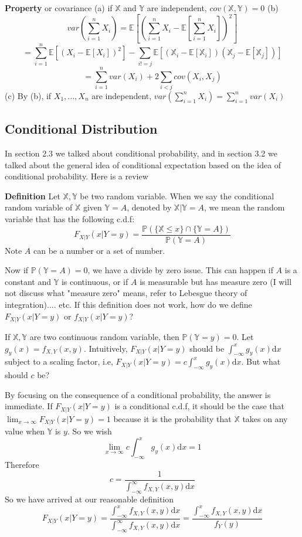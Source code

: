 \documentclass[a4paper,12pt]{article}
\begin{document}
\textbf{Property} or covariance 
(a) if $\mathbb{X}$ and $\mathbb{Y}$ are independent, $cov( \mathbb{X}, \mathbb{Y} ) = 0$ 
(b) $$var(\sum_{i=1}^n X_i) = \mathbb{E}[(\sum_{i=1}^n X_i - \mathbb{E}[\sum_{i=1}^n X_i])^2]$$
$$= \sum_{i=1}^n \mathbb{E}[ (X_i - \mathbb{E}[X_i])^2 ] - \sum_{i!=j}\mathbb{E}[ (\mathbb{X}_i - \mathbb{E}[\mathbb{X}_i])(\mathbb{X}_j - \mathbb{E}[\mathbb{X}_j]) ]$$
$$= \sum_{i=1}^n var(X_i) + 2 \sum_{i<j}cov(X_i, X_j)$$
(c) By (b), if $X_1, ..., X_n$ are independent, $var(\sum_{i=1}^n X_i) = \sum_{i=1}^n var(X_i)$ 

\subsection{Conditional Distribution}
In section 2.3 we talked about conditional probability, and in section 3.2 we talked about the general idea of conditional expectation based on the idea of conditional probability. Here is a review

\textbf{Definition} Let $\mathbb{X}, \mathbb{Y}$ be two random variable. When we say the conditional random variable of $\mathbb{X}$ given $\mathbb{Y} = A$, denoted by $\mathbb{X}|{\mathbb{Y}=A} $, we mean the random variable that has the following c.d.f:
$$F_{X|Y}(x|Y=y) = \frac{\mathbb{P}( \{\mathbb{X} \leq x\} \cap \{\mathbb{Y} = A\} )}{\mathbb{P}(\mathbb{Y} = A)} $$
Note $A$ can be a number or a set of number.

Now if  $\mathbb{P}(\mathbb{Y} = A) = 0$, we have a divide by zero issue. This can happen if $A$ is a constant and $\mathbb{Y}$ is continuous, or if $A$ is measurable but has measure zero (I will not discuss what "measure zero" means, refer to Lebesgue theory of integration).... etc. If this definition does not work, how do we define $F_{X|Y}(x|Y=y)$ or $f_{X|Y}(x|Y=y)$? 

If $\mathbb{X}, \mathbb{Y}$ are two continuous random variable, then $\mathbb{P}(\mathbb{Y} = y) = 0$. Let $g_y(x) = f_{X, Y}(x, y)$. Intuitively, $F_{X|Y}(x|Y=y)$ should be $\int_{-\infty}^x g_y(x) \mathrm{d}x$ subject to a scaling factor, i.e, $F_{X|Y}(x|Y=y) = c\int_{-\infty}^x g_y(x) \mathrm{d}x$. But what should $c$ be?

By focusing on the consequence of a conditional probability, the answer is immediate. If $F_{X|Y}(x|Y=y)$ is a conditional c.d.f, it should be the case that $\lim_{x\to\infty}F_{X|Y}(x|Y=y) = 1$ because it is the probability that $\mathbb{X}$ takes on any value when $\mathbb{Y}$ is $y$. So we wish
$$\lim_{x\to\infty} c\int_{-\infty}^x g_y(x) \mathrm{d}x = 1$$
Therefore
$$c = \frac{1}{\int_{-\infty}^\infty f_{X,Y}(x, y)\mathrm{d}x}$$ 
So we have arrived at our reasonable definition
$$F_{X|Y}(x|Y=y) = \frac{\int_{-\infty}^x f_{X,Y}(x, y) \mathrm{d}x}{\int_{-\infty}^\infty f_{X,Y}(x, y)\mathrm{d}x} = \frac{\int_{-\infty}^x f_{X,Y}(x, y) \mathrm{d}x}{f_Y(y)}$$
\end{document}
